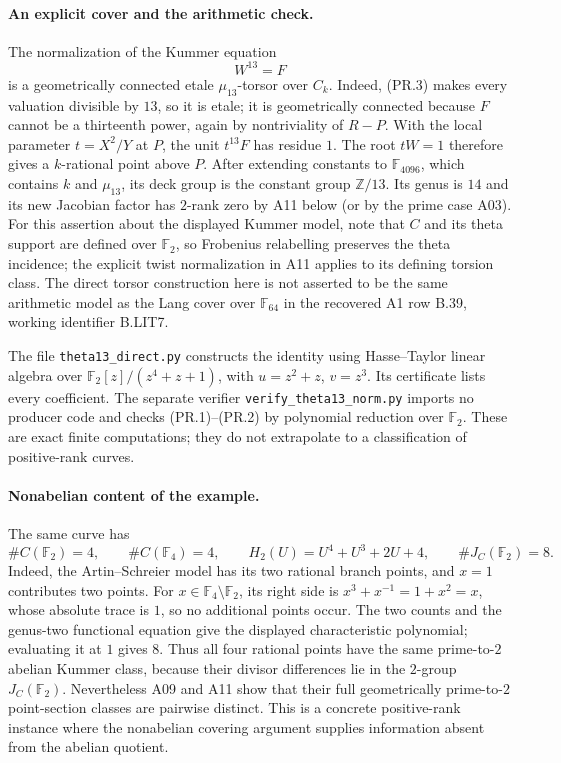 \paragraph{An explicit cover and the arithmetic check.}
The normalization of the Kummer equation
\[
 W^{13}=F
\]
is a geometrically connected etale $\mu_{13}$-torsor over $C_k$.
Indeed, (PR.3) makes every valuation divisible by $13$, so it is
etale; it is geometrically connected because $F$ cannot be a
thirteenth power, again by nontriviality of $R-P$. With the local
parameter $t=X^2/Y$ at $P$, the unit $t^{13}F$ has residue $1$.
The root $tW=1$ therefore gives a $k$-rational point above $P$.
After extending constants to $\mathbb F_{4096}$, which contains
$k$ and $\mu_{13}$, its deck group is the constant group
$\mathbb Z/13$. Its genus is $14$ and its new Jacobian factor has
$2$-rank zero by A11 below (or by the prime case A03).
For this assertion about the displayed Kummer model, note that
$C$ and its theta support are defined over $\mathbb F_2$, so
Frobenius relabelling preserves the theta incidence; the explicit
twist normalization in A11 applies to its defining torsion class.
The direct torsor construction here is not asserted to be the same
arithmetic model as the Lang cover over $\mathbb F_{64}$ in the
recovered A1 row B.39, working identifier B.LIT7.

The file \texttt{theta13\_direct.py} constructs the identity using
Hasse--Taylor linear algebra over
$\mathbb F_2[z]/(z^4+z+1)$, with $u=z^2+z$, $v=z^3$.
Its certificate lists every coefficient. The separate verifier
\texttt{verify\_theta13\_norm.py} imports no producer code and
checks (PR.1)--(PR.2) by polynomial reduction over $\mathbb F_2$.
These are exact finite computations; they do not extrapolate to a
classification of positive-rank curves.

\paragraph{Nonabelian content of the example.}
The same curve has
\[
 \#C(\mathbb F_2)=4,\qquad \#C(\mathbb F_4)=4,\qquad
 H_2(U)=U^4+U^3+2U+4,\qquad \#J_C(\mathbb F_2)=8.
 \tag{PR.10}
\]
Indeed, the Artin--Schreier model has its two rational branch
points, and $x=1$ contributes two points. For
$x\in\mathbb F_4\setminus\mathbb F_2$, its right side is
$x^3+x^{-1}=1+x^2=x$,
whose absolute trace is $1$, so no additional points occur.
The two counts and the genus-two functional equation give the
displayed characteristic polynomial; evaluating it at $1$ gives
$8$. Thus all four rational points have the same prime-to-$2$
abelian Kummer class, because their divisor differences lie in
the $2$-group $J_C(\mathbb F_2)$. Nevertheless A09 and A11 show
that their full geometrically prime-to-$2$ point-section classes
are pairwise distinct. This is a concrete positive-rank instance
where the nonabelian covering argument supplies information
absent from the abelian quotient.

